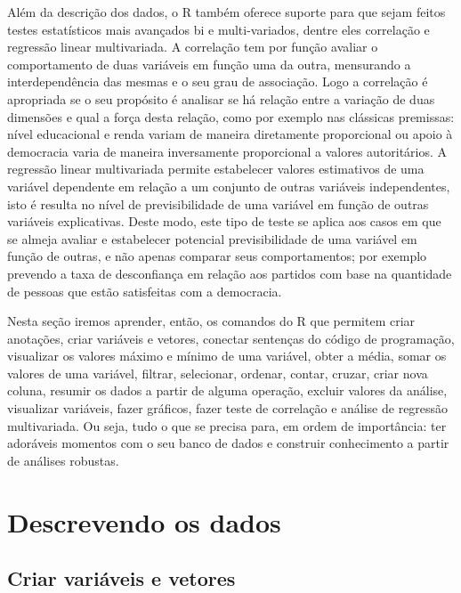 \documentclass[
  brazil,
]{book}
\begin{document}
Além da descrição dos dados, o R também oferece suporte para que sejam feitos testes estatísticos mais avançados bi e multi-variados, dentre eles correlação e regressão linear multivariada. A correlação tem por função avaliar o comportamento de duas variáveis em função uma da outra, mensurando a interdependência das mesmas e o seu grau de associação. Logo a correlação é apropriada se o seu propósito é analisar se há relação entre a variação de duas dimensões e qual a força desta relação, como por exemplo nas clássicas premissas: nível educacional e renda variam de maneira diretamente proporcional ou apoio à democracia varia de maneira inversamente proporcional a valores autoritários. A regressão linear multivariada permite estabelecer valores estimativos de uma variável dependente em relação a um conjunto de outras variáveis independentes, isto é resulta no nível de previsibilidade de uma variável em função de outras variáveis explicativas. Deste modo, este tipo de teste se aplica aos casos em que se almeja avaliar e estabelecer potencial previsibilidade de uma variável em função de outras, e não apenas comparar seus comportamentos; por exemplo prevendo a taxa de desconfiança em relação aos partidos com base na quantidade de pessoas que estão satisfeitas com a democracia.

Nesta seção iremos aprender, então, os comandos do R que permitem criar anotações, criar variáveis e vetores, conectar sentenças do código de programação, visualizar os valores máximo e mínimo de uma variável, obter a média, somar os valores de uma variável, filtrar, selecionar, ordenar, contar, cruzar, criar nova coluna, resumir os dados a partir de alguma operação, excluir valores da análise, visualizar variáveis, fazer gráficos, fazer teste de correlação e análise de regressão multivariada. Ou seja, tudo o que se precisa para, em ordem de importância: ter adoráveis momentos com o seu banco de dados e construir conhecimento a partir de análises robustas.

\hypertarget{descrevendo-os-dados}{%
\section{Descrevendo os dados}\label{descrevendo-os-dados}}

\hypertarget{criar-variuxe1veis-e-vetores}{%
\subsection{Criar variáveis e vetores}\label{criar-variuxe1veis-e-vetores}}
\end{document}

